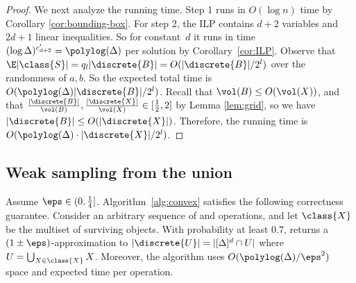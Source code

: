 \begin{proof}
%
    We next analyze the running time. Step 1 runs in $O(\log n)$ time by Corollary \ref{cor:bounding-box}. For step 2, the ILP contains $d+2$ variables and $2d+1$ linear inequalities. So for constant~$d$ it runs in time $(\log \Delta)^{c_{d+2}'} = \polylog(\Delta)$ per solution by Corollary~\ref{cor:ILP}. Observe that $\E |\class{S}| = q_l |\discrete{B}| = O(|\discrete{B}|/2^l)$ over the randomness of $a,b$. So the expected total time is $O(\polylog(\Delta) |\discrete{B}| / 2^l)$. Recall that $\vol(B) \leq O(\vol(X))$, and that $\frac{|\discrete{B}|}{\vol(B)}, \frac{|\discrete{X}|}{\vol(X)} \in [\frac{1}{2}, 2]$ by Lemma \ref{lem:grid}, so we have $|\discrete{B}| \leq O(|\discrete{X}|)$. Therefore, the running time is $O(\polylog(\Delta) \cdot |\discrete{X}|/2^l)$.
\end{proof}
%
\subsection{Weak sampling from the union}
%
\begin{algorithm}[htb]
    \caption{Union volume estimation for dynamic convex bodies}
    \label{alg:convex}
%
%
%
    \end{algorithm}
%
\begin{theorem}
    \label{thm:convex-point-count}
    Assume $\eps \in (0, \frac{1}{4}]$. Algorithm~\ref{alg:convex} satisfies the following correctness guarantee. Consider an arbitrary sequence of \ins and \del operations, and let $\class{X}$ be the multiset of surviving objects. With probability at least $0.7$, \est{} returns a $(1 \pm \eps)$-approximation to $|\discrete{U}| = |[\Delta]^d \cap U|$ where $U = \bigcup_{X \in \class{X}} X$. Moreover, the algorithm uses $O(\polylog(\Delta)/\eps^2)$ space and expected time per operation.
\end{theorem}
